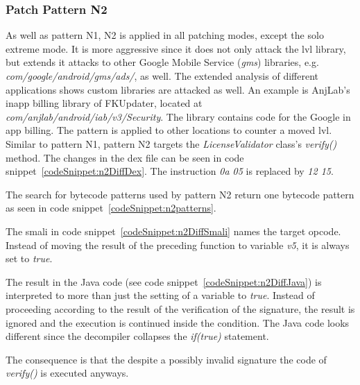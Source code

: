 \subsubsection{Patch Pattern N2}
As well as pattern N1, N2 is applied in all patching modes, except the solo extreme mode.
It is more aggressive since it does not only attack the \gls{lvl} library, but extends it attacks to other Google Mobile Service (\textit{gms}) libraries, e.g.  \textit{com/google/android/gms/ads/}, as well.
The extended analysis of different applications shows custom libraries are attacked as well.
An example is AnjLab's inapp billing library \cite{inappBilling} of FKUpdater, located at \textit{com/anjlab/android/iab/v3/Security}.
The library contains code for the Google in app billing.
The pattern is applied to other locations to counter a moved \gls{lvl}.
Similar to pattern N1, pattern N2 targets the \textit{LicenseValidator} class's \textit{verify()} method.
\newline
The changes in the \gls{dex} file can be seen in code snippet~\ref{codeSnippet:n2DiffDex}.
The instruction \textit{0a 05} is replaced by \textit{12 15}.
\newline

The search for bytecode patterns used by pattern N2 return one bytecode pattern as seen in code snippet~\ref{codeSnippet:n2patterns}.
\newline

The smali in code snippet~\ref{codeSnippet:n2DiffSmali} names the target opcode.
Instead of moving the result of the preceding function to variable \textit{v5}, it is always set to \textit{true}.
\newline

The result in the Java code (see code snippet~\ref{codeSnippet:n2DiffJava}) is interpreted to more than just the setting of a variable to \textit{true}.
Instead of proceeding according to the result of the verification of the signature, the result is ignored and the execution is continued inside the condition.
The Java code looks different since the decompiler collapses the \textit{if(true)} statement.
\newline

The consequence is that the despite a possibly invalid signature the code of \textit{verify()} is executed anyways.

